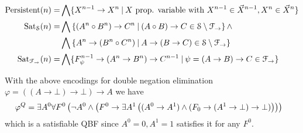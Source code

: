 \documentclass[a4paper,UKenglish,cleveref, autoref, thm-restate]{lipics-v2021}
\begin{document}
\begin{definition}
\begin{align*}
		\text{\normalfont Persistent}(n) = & \bigwedge\{X^{n-1}\to X^n\:|\: X \text{ prop. variable with }X^{n-1}\in\vec X^{n-1}, X^n \in\vec X^{n}\}\\
		\text{\normalfont Sat}_{\mathcal S}(n) = &\bigwedge\left\{(A^n\circ B^n)\to C^n\:|\:(A\circ B)\to C\in \mathcal S\setminus\mathcal F_\to\right\}\wedge\\
		&\bigwedge\left\{A^n\to (B^n\circ C^n)\:|\:A\to (B\to C)\in \mathcal S\setminus\mathcal F_\to\right\}\\
		\text{\normalfont Sat}_{\mathcal F_\to}(n) = & \bigwedge\{F^{n-1}_\psi\to (A^n\to B^n)\to C^{n-1}\:|\:\psi = (A\to B)\to C\in\mathcal F_\to\}
	\end{align*}
\end{definition}

\begin{example}
	With the above encodings for double negation elimination $\varphi = ((A\to \bot)\to \bot)\to A$ we have
	$$\hspace*{-.3cm}
	\varphi^Q = \exists A^0\forall F^0\left(\neg A^0\wedge\left(F^0\to \exists A^1\left((A^0\to A^1)\wedge(F_0\to (A^1\to \bot)\to \bot)\right)\right)\right)
	$$
	which is a satisfiable QBF since $A^0 = 0, A^1 = 1$ satisfies it for any $F^0$.
\end{example}
\end{document}
